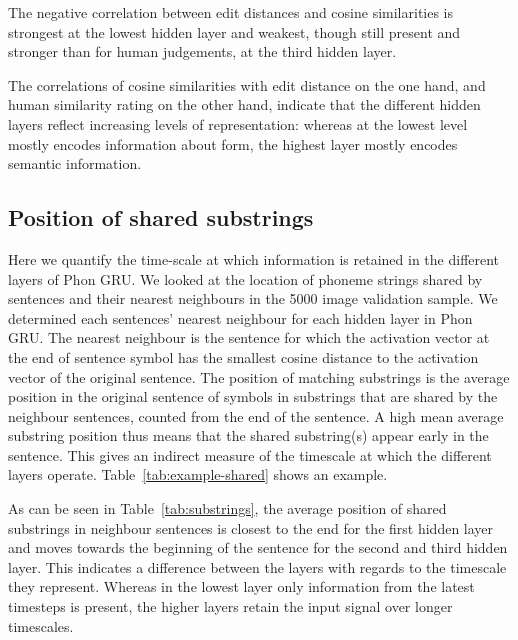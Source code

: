 The negative correlation between edit distances and cosine similarities is strongest at the lowest hidden layer and weakest, though still present and stronger than for human judgements, at the third hidden layer. 

The correlations of cosine similarities with edit distance on the one hand, and human similarity rating on the other hand, indicate that the different hidden layers reflect increasing levels of representation: whereas at the lowest level mostly encodes information about form, the highest layer mostly encodes semantic information.


\subsection{Position of shared substrings}
Here we quantify the time-scale at which information is retained in
the different layers of {\sc Phon GRU}. We looked at the location of
phoneme strings shared by sentences and their nearest neighbours in the 5000 image validation sample.
We determined each sentences' nearest neighbour for each hidden layer in {\sc Phon GRU}. The nearest neighbour is the sentence for which the activation vector at the end of sentence symbol has the smallest cosine distance to the activation vector of the original sentence. The position of matching substrings is the average position in the original sentence of symbols in substrings that are shared by the neighbour sentences, counted from the end of the sentence. A high mean average substring position thus means that the shared substring(s) appear early in the sentence. This gives an indirect measure of the timescale at which the different layers operate. Table~\ref{tab:example-shared} shows an example.

As can be seen in Table~\ref{tab:substrings}, the average position of shared substrings in neighbour sentences is closest to the end for the first hidden layer and moves towards the beginning of the sentence for the second and third hidden layer. This indicates a difference between the layers with regards to the timescale they represent. Whereas in the lowest layer only information from the latest timesteps is present, the higher layers retain the input signal over longer timescales.

